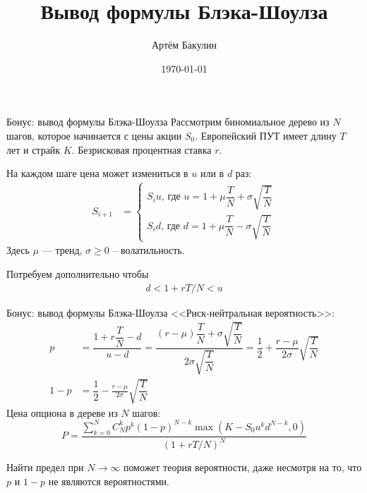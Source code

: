 \documentclass[pdf,12pt]{beamer}
\title{Вывод формулы Блэка-Шоулза}
\author{Артём Бакулин}
\date{\today}
\begin{document}
\begin{frame}
\titlepage
\end{frame}

\begin{frame}{Бонус: вывод формулы Блэка-Шоулза}
\justify
Рассмотрим биномиальное дерево из $N$ шагов, которое начинается с цены акции $S_0$. Европейский ПУТ имеет длину $T$ лет и страйк $K$. Безрисковая процентная ставка $r$.

\vspace{\baselineskip}
На каждом шаге цена может измениться в $u$ или в $d$ раз:
\begin{align*}
S_{i+1} &= \begin{cases}
S_iu\text{, где } u = 1 + \mu \dfrac{T}{N} + \sigma\sqrt{\dfrac{T}{N}} \\
S_id\text{, где } d = 1 + \mu \dfrac{T}{N} - \sigma\sqrt{\dfrac{T}{N}}\end{cases}
\end{align*}
Здесь $\mu$ --- тренд, $\sigma \ge 0$ -- волатильность.
\vspace{\baselineskip}

Потребуем дополнительно чтобы
\begin{align*}
d < 1+rT/N < u
\end{align*}
\end{frame}

\begin{frame}{Бонус: вывод формулы Блэка-Шоулза}
<<Риск-нейтральная вероятность>>:
\begin{align*}
p &= \dfrac{1+r\dfrac{T}{N} - d}{u - d} = \dfrac{\left(r-\mu\right)\dfrac{T}{N} + \sigma\sqrt{\dfrac{T}{N}}}{2\sigma\sqrt{\dfrac{T}{N}}} 
= \dfrac{1}{2} + \dfrac{r -\mu}{2\sigma}\sqrt{\dfrac{T}{N}} \\
1-p &= \dfrac{1}{2} - \frac{r -\mu}{2\sigma}\sqrt{\dfrac{T}{N}}
\end{align*}
Цена опциона в дереве из $N$ шагов:
\begin{equation*}
P = \dfrac{\sum\limits_{k=0}^{N} C^k_Np^k(1-p)^{N-k}\max(K - S_0u^kd^{N-k},0)}{\left(1+rT/N \right)^N}
\end{equation*}

\justify
Найти предел при $N \to \infty$ поможет теория вероятности, даже несмотря на то, что $p$ и $1-p$ не являются вероятностями.
\end{frame}
\end{document}

